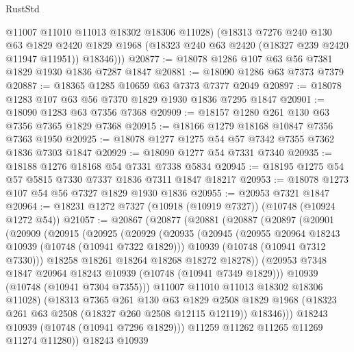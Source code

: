 \begin{lexlean}{RustStd}
\begin{coremodule}
          @11007
          @11010
          @11013
          @18302
          @18306
          @11028)
        (@18313
          @7276
          @240
          @130
          @63
          @1829
          @2420
          @1829
          @1968
          (@18323 @240 @63 @2420 (@18327 @239 @2420 @11947 @11951))
          @18346)))
@20877 := @18078 @1286 @107 @63 @56 @7381 @1829 @1930 @1836 @7287 @1847
@20881 := @18090 @1286 @63 @7373 @7379
@20887 := @18365 @1285 @10659 @63 @7373 @7377 @2049
@20897 := @18078 @1283 @107 @63 @56 @7370 @1829 @1930 @1836 @7295 @1847
@20901 := @18090 @1283 @63 @7356 @7368
@20909 := @18157 @1280 @261 @130 @63 @7356 @7365 @1829 @7368
@20915 := @18166 @1279 @18168 @10847 @7356 @7363 @1950
@20925 := @18078 @1277 @1275 @54 @57 @7342 @7355 @7362 @1836 @7303 @1847
@20929 := @18090 @1277 @54 @7331 @7340
@20935 := @18188 @1276 @18168 @54 @7331 @7338 @5834
@20945 := @18195 @1275 @54 @57 @5815 @7330 @7337 @1836 @7311 @1847 @18217
@20953 := @18078 @1273 @107 @54 @56 @7327 @1829 @1930 @1836
@20955 := @20953 @7321 @1847
@20964 := @18231 @1272 @7327 (@10918 (@10919 @7327)) (@10748 (@10924 @1272 @54))
@21057 := @20867
    (@20877
      (@20881
        (@20887
          (@20897
            (@20901
              (@20909
                (@20915
                  (@20925
                    (@20929
                      (@20935
                        (@20945
                          (@20955 @20964 @18243 @10939 (@10748 (@10941 @7322 @1829)))
                          @10939
                          (@10748 (@10941 @7312 @7330)))
                        @18258
                        @18261
                        @18264
                        @18268
                        @18272
                        @18278))
                    (@20953 @7348 @1847 @20964 @18243 @10939 (@10748 (@10941 @7349 @1829)))
                    @10939
                    (@10748 (@10941 @7304 @7355)))
                  @11007
                  @11010
                  @11013
                  @18302
                  @18306
                  @11028)
                (@18313
                  @7365
                  @261
                  @130
                  @63
                  @1829
                  @2508
                  @1829
                  @1968
                  (@18323 @261 @63 @2508 (@18327 @260 @2508 @12115 @12119))
                  @18346)))
            @18243
            @10939
            (@10748 (@10941 @7296 @1829)))
          @11259
          @11262
          @11265
          @11269
          @11274
          @11280))
      @18243
      @10939

\end{coremodule}
\end{lexlean}
